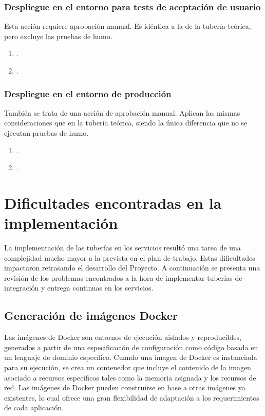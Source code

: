 \subsubsection{Despliegue en el entorno para tests de aceptación de usuario}
%
Esta acción requiere aprobación manual. Es idéntica a la de la tubería
teórica, pero excluye las pruebas de humo.
%
\begin{enumerate}
\item {}.
\item {}.
\end{enumerate}
%
\subsubsection{Despliegue en el entorno de producción}
%
También se trata de una acción de aprobación manual. Aplican las
mismas consideraciones que en la tubería teórica, siendo la única
diferencia que no se ejecutan pruebas de humo.
%
\begin{enumerate}
\item {}.
\item {}.
\end{enumerate}
%
%
\section{Dificultades encontradas en la implementación}
%
La implementación de las tuberías en los servicios resultó una tarea
de una complejidad mucho mayor a la prevista en el plan de
trabajo. Estas dificultades impactaron retrasando el desarrollo del
Proyecto. A continuación se presenta una revisión de los problemas
encontrados a la hora de implementar tuberías de integración y entrega
continuas en los servicios.
%
\subsection{Generación de imágenes Docker}
%
Las imágenes de Docker son entornos de ejecución aislados y
reproducibles, generados a partir de una especificación de
configuración como código basada en un lenguaje de dominio
específico. Cuando una imagen de Docker es instanciada para su
ejecución, se crea un contenedor que incluye el contenido de la imagen
asociado a recursos específicos tales como la memoria asignada y los
recursos de red. Las imágenes de Docker pueden construirse en base a
otras imágenes ya existentes, lo cual ofrece una gran flexibilidad de
adaptación a los requerimientos de cada aplicación.

